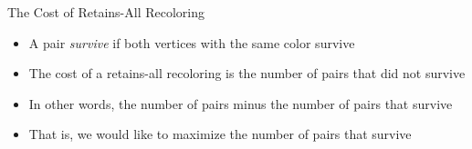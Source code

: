\begin{frame}{The Cost of Retains-All Recoloring}

\begin{itemize}
\item
A pair \emph{survive} if both vertices with the same color survive
\item 
The cost of a retains-all recoloring is the number of pairs that did not survive
\item 	 
In other words, the number of pairs minus the number of pairs that survive
\item 
That is, we would like to maximize the number of pairs that survive
\end{itemize}

\end{frame}